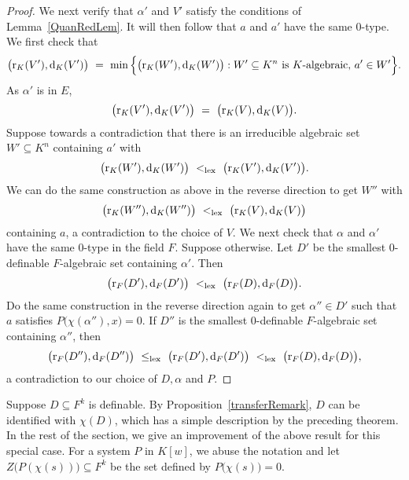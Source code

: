 \begin{proof}
We next verify that $ \alpha'$ and $ V'$ satisfy the conditions of Lemma~\ref{QuanRedLem}. It will then follow that $a$ and $a'$ have the same $0$-type. We first check that
$$\big(\mathrm{r}_K(V'), \mathrm{d}_K(V')\big)\ =\  \min\Big\{ \big(\mathrm{r}_K(W'), \mathrm{d}_K(W')\big) : W' \subseteq K^n \text{ is } K\text{-algebraic, } a' \in W' \Big\}.$$
As $ \alpha'$ is in $E$, $$\big(\mr_K(V'), \md_K(V')\big)\ =\ \big(\mr_K(V), \md_K(V)\big).$$ 
Suppose towards a contradiction that there is an irreducible algebraic set $ W' \subseteq K^n$ containing $a'$ with $$ \big(\mr_K(W'), \md_K(W')\big) \ <_{\text{lex}}\ \big(\mr_K(V'), \md_K(V')\big).$$ 
We can do the same construction as above in the reverse direction to get $ W''$ with 
$$ \big(\mr_K(W''), \md_K(W'')\big)\ <_{\text{lex}} \  \big(\mr_K(V), \md_K(V)\big)$$ containing $a$, a contradiction to the choice of $V$. 
We next check that $\alpha$ and $\alpha'$ have the same $0$-type in the field $F$. Suppose otherwise. Let $ D'$ be the  smallest 0-definable $F$-algebraic set containing $\alpha'$.
Then $$ \big(\mr_F(D'), \md_F(D') \big) \ <_{\text{lex}}\ \big(\mr_F(D), \md_F(D) \big).$$
Do the same construction in the reverse direction again to get $ \alpha'' \in D'$ such that $a $ satisfies $ P\big( \chi( \alpha''), x\big) =0$.
If $ D''$ is the smallest 0-definable $F$-algebraic set containing $\alpha''$, then $$ \big(\mr_F(D''), \md_F(D'') \big)\ \leq_{\text{lex}}\  \big(\mr_F(D'), \md_F(D') \big)\ <_{\text{lex}} \ \big(\mr_F(D), \md_F(D) \big), $$ a contradiction to our choice of $D, \alpha$ and $P$.
\end{proof}


\noindent
Suppose $D \subseteq F^k$ is definable. By Proposition~\ref{transferRemark}, $D$ can be identified with $\chi(D) $, which has a simple description by the preceding theorem. In the rest of the section, we give an improvement of the above result for this special case. 
For a system  $P$ in $K[w]$, we abuse the notation and let $Z\big(P(\chi(s))\big) \subseteq F^k$ be the set defined by  $P\big(\chi(s)\big)=0$.

